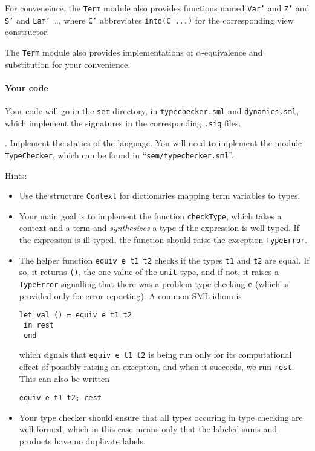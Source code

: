 \documentclass[11pt]{article}
\newcommand\sml[1]{\texttt{#1}}
\newcounter{taskcounter}
\newcounter{taskPercentCounter}
\newcounter{taskcounterSection}
\newcommand{\mayresettaskcounter}{\ifthenelse{\value{taskcounterSection} < \value{section}}
{\setcounter{taskcounterSection}{\value{section}}\setcounter{taskcounter}{1}}{}}
\newcommand{\task}[1]
  {\bigskip \noindent {\bf Task\mayresettaskcounter{}\addtocounter{taskPercentCounter}{#1} \arabic{section}.\arabic{taskcounter}\addtocounter{taskcounter}{1}}.}
\begin{document}
For conveneince, the \sml{Term} module also provides functions named
\sml{Var'} and \sml{Z'} and \sml{S'} and \sml{Lam'} \ldots, where
\sml{C'} abbreviates \sml{into(C ...)} for the corresponding view
constructor.

The \sml{Term} module also provides implementations of
$\alpha$-equivalence and substitution for your convenience.  

\paragraph{Your code}

Your code will go in the \sml{sem} directory, in \sml{typechecker.sml}
and \sml{dynamics.sml}, which implement the signatures in the
corresponding \sml{.sig} files.  

\task{0} Implement the statics of the language. You will need to
implement the module \verb|TypeChecker|, which can be found in
``\verb|sem/typechecker.sml|''.

Hints:
\begin{itemize}
\item Use the structure \sml{Context} for dictionaries mapping term
  variables to types.

\item Your main goal is to implement the function \sml{checkType},
which takes a context and a term and \emph{synthesizes} a type if the
expression is well-typed.  If the expression is ill-typed, the function
should raise the exception \sml{TypeError}.  

\item The helper function \sml{equiv e t1 t2} checks if the types
  \sml{t1} and \sml{t2} are equal. If so, it returns \sml{()}, the one
  value of the \sml{unit} type, and if not, it raises a \sml{TypeError}
  signalling that there was a problem type checking \sml{e} (which is
  provided only for error reporting).  A common SML idiom is 
\begin{verbatim}
let val () = equiv e t1 t2 
 in rest
 end 
\end{verbatim}
which signals that \sml{equiv e t1 t2} is being run only for its
computational effect of possibly raising an exception, and when it
succeeds, we run \sml{rest}.  This can also be written
\begin{verbatim}
equiv e t1 t2; rest
\end{verbatim}

\item Your type checker should ensure that all types occuring in type
  checking are well-formed, which in this case means only that the
  labeled sums and products have no duplicate labels.  

\end{itemize}
\end{document}
